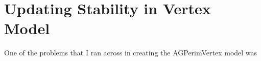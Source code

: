 \documentclass[12pt,a4paper]{article}
\begin{document}
\section{Updating Stability in Vertex Model}
One of the problems that I ran across in creating the AGPerimVertex model was                                                                                                                                                                                                                                                                                                                                                                                                                                                                                                                                                                                                                                                                                                                                                                                                                                                                                                                                                                                                                                                                                                                                                                                                                                                                                                                                                                                                                                                                                                                                                                                                                                                                                                                                                                                                                                                                                                                                                                                                                                                                                                                                                                                                                                                                                                                                                                                                                                                                                                                                                                                                                                                                                                                                                                                                                                                                                                                                                                                                                                                                                                                              
\end{document}
